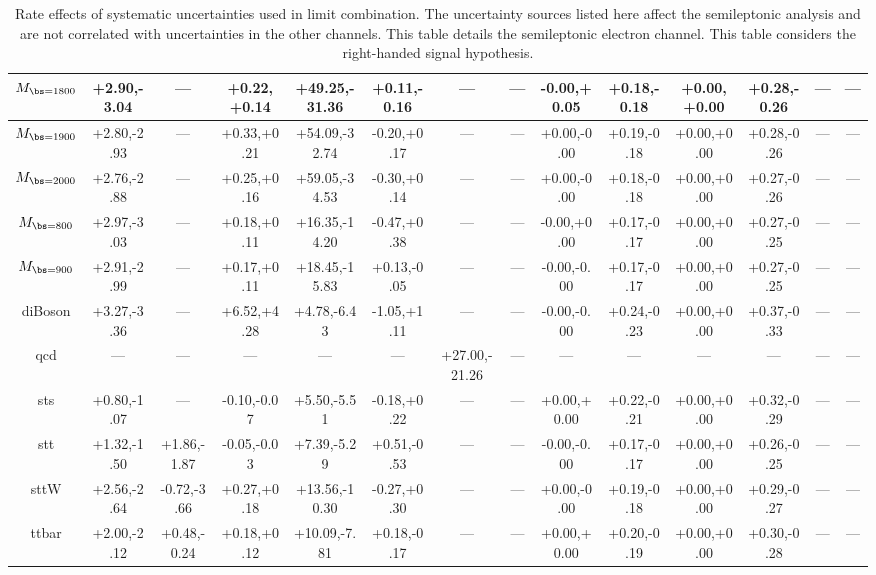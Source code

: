 \begin{table}
\begin{center}
\begin{small}
{\begin{tabular}{|c||ccccccccccccc|}
\hline 
$M_{\bs=1800}$ & +2.90,-3.04 & --- & +0.22,+0.14 & +49.25,-31.36 & +0.11,-0.16 & --- & --- & -0.00,+0.05 & +0.18,-0.18 & +0.00,+0.00 & +0.28,-0.26 & --- & --- \\ 
\hline 
$M_{\bs=1900}$ & +2.80,-2.93 & --- & +0.33,+0.21 & +54.09,-32.74 & -0.20,+0.17 & --- & --- & +0.00,-0.00 & +0.19,-0.18 & +0.00,+0.00 & +0.28,-0.26 & --- & --- \\ 
\hline 
$M_{\bs=2000}$ & +2.76,-2.88 & --- & +0.25,+0.16 & +59.05,-34.53 & -0.30,+0.14 & --- & --- & +0.00,-0.00 & +0.18,-0.18 & +0.00,+0.00 & +0.27,-0.26 & --- & --- \\ 
\hline 
$M_{\bs=800}$ & +2.97,-3.03 & --- & +0.18,+0.11 & +16.35,-14.20 & -0.47,+0.38 & --- & --- & -0.00,+0.00 & +0.17,-0.17 & +0.00,+0.00 & +0.27,-0.25 & --- & --- \\ 
\hline 
$M_{\bs=900}$ & +2.91,-2.99 & --- & +0.17,+0.11 & +18.45,-15.83 & +0.13,-0.05 & --- & --- & -0.00,-0.00 & +0.17,-0.17 & +0.00,+0.00 & +0.27,-0.25 & --- & --- \\ 
\hline 
diBoson & +3.27,-3.36 & --- & +6.52,+4.28 & +4.78,-6.43 & -1.05,+1.11 & --- & --- & -0.00,-0.00 & +0.24,-0.23 & +0.00,+0.00 & +0.37,-0.33 & --- & --- \\ 
\hline 
qcd & --- & --- & --- & --- & --- & +27.00,-21.26 & --- & --- & --- & --- & --- & --- & --- \\ 
\hline 
sts & +0.80,-1.07 & --- & -0.10,-0.07 & +5.50,-5.51 & -0.18,+0.22 & --- & --- & +0.00,+0.00 & +0.22,-0.21 & +0.00,+0.00 & +0.32,-0.29 & --- & --- \\ 
\hline 
stt & +1.32,-1.50 & +1.86,-1.87 & -0.05,-0.03 & +7.39,-5.29 & +0.51,-0.53 & --- & --- & -0.00,-0.00 & +0.17,-0.17 & +0.00,+0.00 & +0.26,-0.25 & --- & --- \\ 
\hline 
sttW & +2.56,-2.64 & -0.72,-3.66 & +0.27,+0.18 & +13.56,-10.30 & -0.27,+0.30 & --- & --- & +0.00,-0.00 & +0.19,-0.18 & +0.00,+0.00 & +0.29,-0.27 & --- & --- \\ 
\hline 
ttbar & +2.00,-2.12 & +0.48,-0.24 & +0.18,+0.12 & +10.09,-7.81 & +0.18,-0.17 & --- & --- & +0.00,+0.00 & +0.20,-0.19 & +0.00,+0.00 & +0.30,-0.28 & --- & --- \\ 
\hline
\end{tabular}
}
\caption{Rate effects of systematic uncertainties used in limit combination.  The uncertainty sources listed here affect the semileptonic analysis and are not correlated with uncertainties in the other channels.  
This table details the semileptonic electron channel.  This table considers the right-handed signal hypothesis.}
\label{table:bsRsysSl1}

\end{small}
\end{center}
\end{table}




